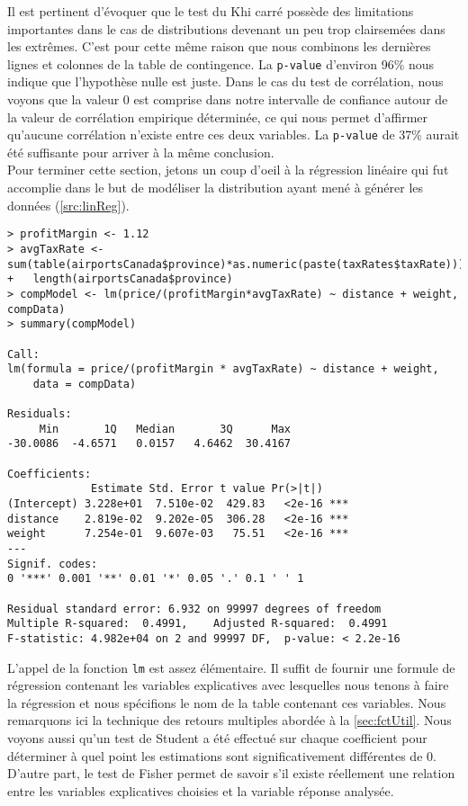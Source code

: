 \vspace{\baselineskip}
Il est pertinent d'évoquer que le test du Khi carré possède des limitations importantes dans le cas de distributions devenant un peu trop clairsemées dans les extrêmes. C'est pour cette même raison que nous combinons les dernières lignes et colonnes de la table de contingence. \cite{Rfunction:chisqWarning} La \texttt{p-value} d'environ 96\% nous indique que l'hypothèse nulle est juste. Dans le cas du test de corrélation, nous voyons que la valeur 0 est comprise dans notre intervalle de confiance autour de la valeur de corrélation empirique déterminée, ce qui nous permet d'affirmer qu'aucune corrélation n'existe entre ces deux variables. La \texttt{p-value} de 37\% aurait été suffisante pour arriver à la même conclusion. \\

Pour terminer cette section, jetons un coup d'oeil à la régression linéaire qui fut accomplie dans le but de modéliser la distribution ayant mené à générer les données (\autoref{src:linReg}).

\begin{lstlisting}[caption = Régression linéaire sur données empiriques,label=src:linReg]
> profitMargin <- 1.12
> avgTaxRate <- sum(table(airportsCanada$province)*as.numeric(paste(taxRates$taxRate)))/
+   length(airportsCanada$province)
> compModel <- lm(price/(profitMargin*avgTaxRate) ~ distance + weight, compData)
> summary(compModel)

Call:
lm(formula = price/(profitMargin * avgTaxRate) ~ distance + weight, 
    data = compData)

Residuals:
     Min       1Q   Median       3Q      Max 
-30.0086  -4.6571   0.0157   4.6462  30.4167 

Coefficients:
             Estimate Std. Error t value Pr(>|t|)    
(Intercept) 3.228e+01  7.510e-02  429.83   <2e-16 ***
distance    2.819e-02  9.202e-05  306.28   <2e-16 ***
weight      7.254e-01  9.607e-03   75.51   <2e-16 ***
---
Signif. codes:  
0 '***' 0.001 '**' 0.01 '*' 0.05 '.' 0.1 ' ' 1

Residual standard error: 6.932 on 99997 degrees of freedom
Multiple R-squared:  0.4991,	Adjusted R-squared:  0.4991 
F-statistic: 4.982e+04 on 2 and 99997 DF,  p-value: < 2.2e-16
\end{lstlisting}

\vspace{\baselineskip}
L'appel de la fonction \texttt{lm} \cite{Rfunction:lm} est assez élémentaire. Il suffit de fournir une formule de régression contenant les variables explicatives avec lesquelles nous tenons à faire la régression et nous spécifions le nom de la table contenant ces variables. Nous remarquons ici la technique des retours multiples abordée à la \autoref{sec:fctUtil}. Nous voyons aussi qu'un test de Student a été effectué sur chaque coefficient pour déterminer à quel point les estimations sont significativement différentes de 0. D'autre part, le test de Fisher permet de savoir s'il existe réellement une relation entre les variables explicatives choisies et la variable réponse analysée. \cite{outputLM} \\

